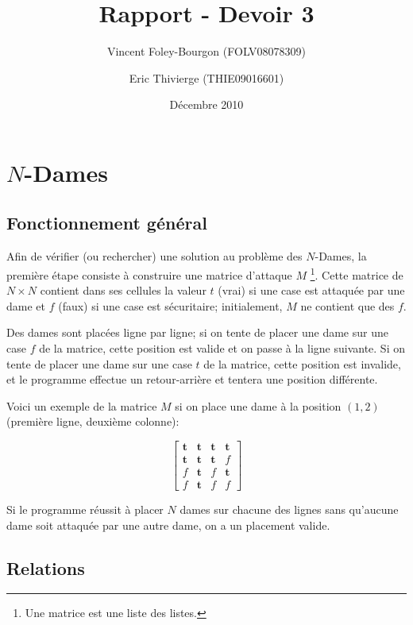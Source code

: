 \documentclass[10pt]{article}
\begin{document}
\title{Rapport - Devoir 3}
\date{Décembre 2010}
\author{Vincent Foley-Bourgon (FOLV08078309) \and
    Eric Thivierge (THIE09016601)}

\maketitle

\section{$N$-Dames}

\subsection{Fonctionnement général}

Afin de vérifier (ou rechercher) une solution au problème des
$N$-Dames, la première étape consiste à construire une matrice
d'attaque $M$ \footnote{Une matrice est une liste des listes.}. Cette
matrice de $N \times N$ contient dans ses cellules la valeur $t$
(vrai) si une case est attaquée par une dame et $f$ (faux) si une case
est sécuritaire; initialement, $M$ ne contient que des $f$.

Des dames sont placées ligne par ligne; si on tente de placer une dame
sur une case $f$ de la matrice, cette position est valide et on passe
à la ligne suivante. Si on tente de placer une dame sur une case $t$
de la matrice, cette position est invalide, et le programme effectue
un retour-arrière et tentera une position différente.

Voici un exemple de la matrice $M$ si on place une dame à la position
$(1,2)$ (première ligne, deuxième colonne):

\[
\begin{bmatrix}
  \textbf{t} & \textbf{t} & \textbf{t} & \textbf{t} \\
  \textbf{t} & \textbf{t} & \textbf{t} & f \\
  f & \textbf{t} & f & \textbf{t} \\
  f & \textbf{t} & f & f
  \end{bmatrix}
\]

Si le programme réussit à placer $N$ dames sur chacune des lignes sans
qu'aucune dame soit attaquée par une autre dame, on a un placement
valide.

\subsection{Relations}
\end{document}
